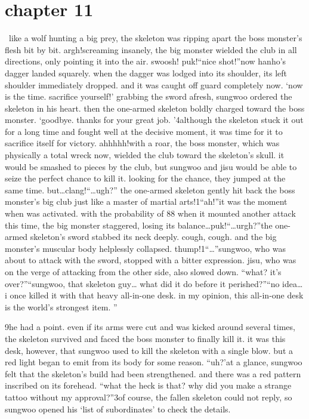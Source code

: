 \section{chapter 11}






 like a wolf hunting a big prey, the skeleton was ripping apart the boss monster’s flesh bit by bit.
argh!screaming insanely, the big monster wielded the club in all directions, only pointing it into the air.
swoosh! puk!“nice shot!”now hanho’s dagger landed squarely.
 when the dagger was lodged into its shoulder, its left shoulder immediately dropped.
 and it was caught off guard completely now.
‘now is the time.
 sacrifice yourself!’
grabbing the sword afresh, sungwoo ordered the skeleton in his heart.
 then the one-armed skeleton boldly charged toward the boss monster.
‘goodbye.
 thanks for your great job.
’4although the skeleton stuck it out for a long time and fought well at the decisive moment, it was time for it to sacrifice itself for victory.
ahhhhh!with a roar, the boss monster, which was physically a total wreck now, wielded the club toward the skeleton’s skull.
 it would be smashed to pieces by the club, but sungwoo and jisu would be able to seize the perfect chance to kill it.
 looking for the chance, they jumped at the same time.
but…clang!“…ugh?”
the one-armed skeleton gently hit back the boss monster’s big club just like a master of martial arts!1“ah!”it was the moment when  was activated.
 with the probability of 88%
when it mounted another attack this time, the big monster staggered, losing its balance…puk!“…urgh?”the one-armed skeleton’s sword stabbed its neck deeply.
cough, cough.
and the big monster’s muscular body helplessly collapsed.
thump!1“…”sungwoo, who was about to attack with the sword, stopped with a bitter expression.
 jisu, who was on the verge of attacking from the other side, also slowed down.
“what? it’s over?”“sungwoo, that skeleton guy… what did it do before it perished?”“no idea… i once killed it with that heavy all-in-one desk.
 in my opinion, this all-in-one desk is the world’s strongest item.
”

9he had a point.
 even if its arms were cut and was kicked around several times, the skeleton survived and faced the boss monster to finally kill it.
 it was this desk, however, that sungwoo used to kill the skeleton with a single blow.
but a red light began to emit from its body for some reason.
“uh?’at a glance, sungwoo felt that the skeleton’s build had been strengthened.
 and there was a red pattern inscribed on its forehead.
“what the heck is that? why did you make a strange tattoo without my approval?”3of course, the fallen skeleton could not reply, so sungwoo opened his ‘list of subordinates’ to check the details.


 